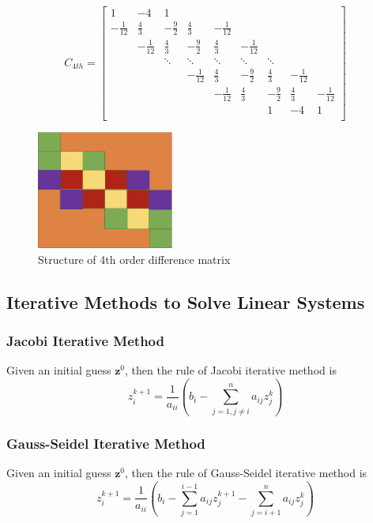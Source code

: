 \documentclass[a4paper]{article}
\begin{document}
\[
C_{4th}
=
\begin{bmatrix}
    1 & -4 &1\\
    -\frac{1}{12}  & \frac{4}{3}  & -\frac{9}{2} & \frac{4}{3}  & - \frac{1}{12} & &&\\
     &-\frac{1}{12}  & \frac{4}{3}  & -\frac{9}{2} & \frac{4}{3}  & - \frac{1}{12} & &&\\
     && \ddots& \ddots & \ddots & \ddots & \ddots & \\
    &&& -\frac{1}{12}  & \frac{4}{3}  & -\frac{9}{2} & \frac{4}{3}  & - \frac{1}{12} \\
    &&&& -\frac{1}{12}  & \frac{4}{3}  & -\frac{9}{2} & \frac{4}{3}  & - \frac{1}{12} \\
    &&&& &&1 & -4 &1\\
\end{bmatrix}
\] 
\begin{figure}
\centering
\includegraphics[width=0.4\textwidth]{4th.png}
\caption{\label{4th}Structure of 4th order difference matrix}
\end{figure}

\subsection{Iterative Methods to Solve Linear Systems}
\subsubsection{Jacobi Iterative Method}
Given an initial guess $\mathbf{z}^0$, then the rule of Jacobi iterative method is 
$$z_i^{k+1} = \frac{1}{a_{ii}}(b_i-\sum_{j=1,j\neq i}^n a_{ij}z_j^k)$$

\subsubsection{Gauss-Seidel Iterative Method}
Given an initial guess $\mathbf{z}^0$, then the rule of Gauss-Seidel iterative method is 
$$z_i^{k+1} = \frac{1}{a_{ii}}(b_i-\sum_{j=1}^{i-1} a_{ij}z_j^{k+1}-\sum_{j=i+1}^{n} a_{ij}z_j^{k})$$
\end{document}
